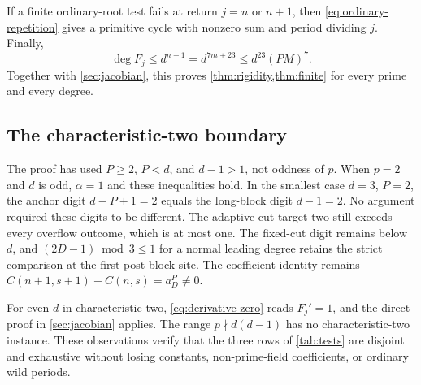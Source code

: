 If a finite ordinary-root test fails at return $j=n$ or $n+1$,
then \eqref{eq:ordinary-repetition} gives a primitive cycle
with nonzero sum and period dividing $j$. Finally,
\[
 \deg F_j\le d^{n+1}=d^{7m+23}\le d^{23}(PM)^7.
\]
Together with \cref{sec:jacobian}, this proves
\cref{thm:rigidity,thm:finite} for every prime and every degree.

\subsection{The characteristic-two boundary}

The proof has used $P\ge2$, $P<d$, and $d-1>1$, not oddness
of $p$. When $p=2$ and $d$ is odd, $\alpha=1$ and these
inequalities hold. In the smallest case $d=3$, $P=2$, the
anchor digit $d-P+1=2$ equals the long-block digit $d-1=2$.
No argument required these digits to be different. The adaptive
cut target two still exceeds every overflow outcome, which is
at most one. The fixed-cut digit remains below $d$, and
$(2D-1)\bmod3\le1$ for a normal leading degree retains the
strict comparison at the first post-block site. The coefficient
identity remains $C(n+1,s+1)-C(n,s)=a_D^P\ne0$.

For even $d$ in characteristic two, \eqref{eq:derivative-zero}
reads $F_j'=1$, and the direct proof in \cref{sec:jacobian}
applies. The range $p\nmid d(d-1)$ has no characteristic-two
instance. These observations verify that the three rows of
\cref{tab:tests} are disjoint and exhaustive without losing
constants, non-prime-field coefficients, or ordinary wild periods.
